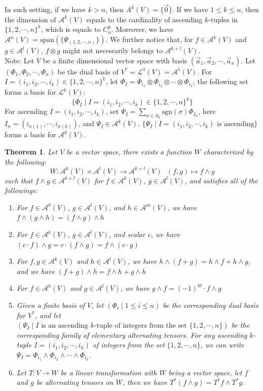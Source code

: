 \documentclass[15pt]{book}
\theoremstyle{break}
\theoremstyle{break}
\newtheorem{thm}{Theorem}[section]
\newcommand{\Lt}{\mathcal{L}}
\newcommand{\A}{\mathcal{A}}
\newcommand{\spa}{\text{span}}
\newcommand{\note}{\color{red}Note: \color{black}}
\begin{document}
In such setting, if we have $k>n$, then $A^k(V) = \{ \vec{0}\}$. If we have $1\leq k \leq n$, then the dimension of $\A^k(V)$ equals to the cardinality of ascending $k$-tuples in $\{1,2,\cdots, n\}^k$, which is equals to $C_n^k$. Moreover, we have $\A^n(V) = \spa(\{\Psi_{(1,2,\cdots, n)}\})$. We further notice that, for $f\in \A^k(V)$ and $g \in \A^l(V)$, $f\otimes g$ might not necessarily belongs to $\A^{k+l}(V)$.\\


\note Let $V$ be a finite dimensional vector space with basis $(\vec{a}_1,\vec{a}_2,\cdots, \vec{a}_n)$. Let $(\Phi_1,\Phi_2,\cdots, \Phi_n)$ be the dual basis of $V^* = \Lt^1(V) = \A^1(V)$. For $I = (i_1,i_2,\cdots, i_k) \in \{1,2,\cdots, n\}^k$, let $\Phi_I = \Phi_{i_1}\otimes \Phi_{i_2} \otimes \cdots \otimes \Phi_{i_k}$, the following set forms a basis for $\Lt^k(V)$: 
$$\{\Phi_I\mid I = (i_1,i_2,\cdots, i_k) \in \{1,2,\cdots, n\}^k\}$$ For ascending $I= (i_1,i_2,\cdots, i_k)$, set $\Psi_I  = \sum_{\sigma \in S_k}\text{sgn}(\sigma) \Phi_{I_{\sigma}}$, here $I_{\sigma} = (i_{\sigma(1)},\cdots, i_{\sigma(k)})$, and $\Psi_I \in \A^k(V)$. $\{\Psi_I \mid I= (i_1,i_2,\cdots, i_k) \text{ is ascending}\}$ forms a basis for $\A^k(V)$. 
\begin{thm}
Let $V$ be a vector space, there exists a function $W$ characterized by the following: 
$$W:\A^k(V) \times \A^l(V) \to \A^{k+l}(V) \ \ \ (f,g)\mapsto f \wedge g$$ 
such that $f\wedge g \in \A^{k+l}(V)$ for $f \in \A^k(V)$, $g \in \A^l(V)$, and satisfies all of the followings:
\begin{enumerate}[topsep=3pt,itemsep=-1ex,partopsep=1ex,parsep=1ex]
\item For $f \in \A^k(V)$, $g \in \A^l(V)$, and $h \in \A^m(V)$, we have $f\wedge(g\wedge h) = (f\wedge g) \wedge h$
\item For $f \in \A^k(V)$, $g \in \A^l(V)$, and scalar $c$, we have $(c\cdot f) \wedge g = c\cdot (f\wedge g) = f\wedge (c\cdot g)$
\item For $f,g \in \A^k(V)$ and $h \in \A^l(V)$, we have $h\wedge (f+g) = h\wedge f + h\wedge g$, and we have $(f+g)\wedge h = f\wedge h + g \wedge h$
\item For $f \in \A^k(V)$ and $g \in \A^l(V)$, we have $g\wedge f = (-1)^{kl} \cdot f\wedge g$
\item Given a finite basis of $V$, let $(\Phi_i \mid 1 \leq i \leq n)$ be the corresponding dual basis for $V^*$, and let $(\Psi_I\mid I \text{ is an ascending }k\text{-tuple}\text{ of integers from the set }\{1,2,\cdots, n\})$ be the corresponding family of elementary alternating tensors. For any  ascending $k$-tuple $I = (i_1,i_2,\cdots, i_k)$ of integers from the set $\{1,2,\cdots, n\}$, we can write $\Psi_I = \Phi_{i_1}\wedge \Phi_{i_2}\wedge \cdots \wedge \Phi_{i_k}$. 
\item Let $T:V\to W$ be a linear transformation with $W$ being a vector space, let $f$ and $g$ be alternating tensors on $W$, then we have $T^*(f\wedge g) = T^*f \wedge T^* g$. 
\end{enumerate}
\end{thm}
\end{document}
